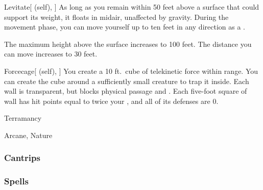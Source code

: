 \lowercase{\hypertarget{spell:Levitate}{}}\label{spell:Levitate}
\begin{attuneability}[Rank 4]{\hypertarget{spell:Levitate}{Levitate}}[ (self), ]
As long as you remain within 50 feet above a surface that could support its weight, it floats in midair, unaffected by gravity.
During the movement phase, you can move yourself up to ten feet in any direction as a .

\rankline
{} The maximum height above the surface increases to 100 feet.
 The distance you can move increases to 30 feet.

\end{attuneability}
\vspace{0.25em}



\lowercase{\hypertarget{spell:Forcecage}{}}\label{spell:Forcecage}
\begin{attuneability}[Rank 8]{\hypertarget{spell:Forcecage}{Forcecage}}[ (self), ]
\targetrule
You create a 10 ft.\ cube of telekinetic force within \rngmed range.
You can create the cube around a sufficiently small creature to trap it inside.
Each wall is transparent, but blocks physical passage and .
Each five-foot square of wall has hit points equal to twice your , and all of its defenses are 0.

\end{attuneability}
\vspace{0.25em}


\newpage
\begin{spellsection}{Terramancy}

\begin{spellheader}
\end{spellheader}


 Arcane, Nature

\subsubsection{Cantrips}


\end{spellsection}


\subsubsection{Spells}


